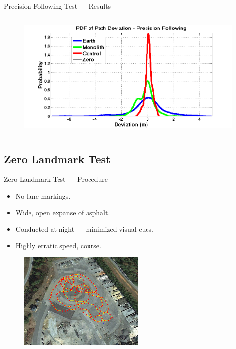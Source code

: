 \documentclass{beamer}
\begin{document}
\begin{frame}{Precision Following Test --- Results}
\begin{columns}
\begin{column}{0.5\textwidth}
\begin{figure}
          \end{figure}
          \vspace{-20pt}
          \begin{figure}
            \includegraphics[width=\textwidth]{../graphics/precision_following_dev_pdf.png}
          \end{figure}
        \end{column}
      \end{columns}
    \end{frame}



  \subsection{Zero Landmark Test}
    \begin{frame}{Zero Landmark Test --- Procedure}
      \begin{itemize}
        \item No lane markings.
        \item Wide, open expanse of asphalt.
        \item Conducted at night --- minimized visual cues.
        \item Highly erratic speed, course.
      \end{itemize}
      \begin{figure}
        \centering
        \includegraphics[width=0.55\textwidth]{../graphics/zero_landmark_path.png}
      \end{figure}     
    \end{frame}
\end{document}
